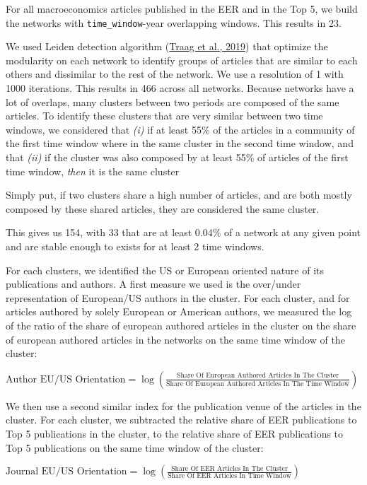 \documentclass[]{elsarticle} %
\begin{document}
For all macroeconomics articles published in the EER and in the Top 5,
we build the networks with \texttt{time\_window}-year overlapping
windows. This results in 23.

We used Leiden detection algorithm
(\protect\hyperlink{ref-traag2019}{Traag et al., 2019}) that optimize
the modularity on each network to identify groups of articles that are
similar to each others and dissimilar to the rest of the network. We use
a resolution of 1 with 1000 iterations. This results in 466 across all
networks. Because networks have a lot of overlaps, many clusters between
two periods are composed of the same articles. To identify these
clusters that are very similar between two time windows, we considered
that \emph{(i)} if at least 55\% of the articles in a community of the
first time window where in the same cluster in the second time window,
and that \emph{(ii)} if the cluster was also composed by at least 55\%
of articles of the first time window, \emph{then} it is the same cluster

Simply put, if two clusters share a high number of articles, and are
both mostly composed by these shared articles, they are considered the
same cluster.

This gives us 154, with 33 that are at least 0.04\% of a network at any
given point and are stable enough to exists for at least 2 time windows.

For each clusters, we identified the US or European oriented nature of
its publications and authors. A first measure we used is the over/under
representation of European/US authors in the cluster. For each cluster,
and for articles authored by solely European or American authors, we
measured the log of the ratio of the share of european authored articles
in the cluster on the share of european authored articles in the
networks on the same time window of the cluster:

\({\scriptstyle \text{Author EU/US Orientation}=\log(\frac{\text{Share Of European Authored Articles In The Cluster}}{\text{Share Of European Authored Articles In The Time Window}})}\)

We then use a second similar index for the publication venue of the
articles in the cluster. For each cluster, we subtracted the relative
share of EER publications to Top 5 publications in the cluster, to the
relative share of EER publications to Top 5 publications on the same
time window of the cluster:

\({\scriptstyle \text{Journal EU/US Orientation}=\log(\frac{\text{Share Of EER Articles In The Cluster}}{\text{Share Of EER  Articles In Time Window}})}\)
\end{document}
